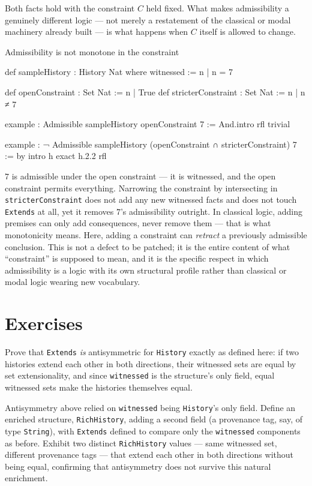 Both facts hold with the constraint $C$ held fixed. What makes
admissibility a genuinely different logic — not merely a restatement
of the classical or modal machinery already built — is what happens
when $C$ itself is allowed to change.

\begin{countermodel}{Admissibility is not monotone in the constraint}
\begin{lean}
def sampleHistory : History Nat where
  witnessed := {n | n = 7}

def openConstraint : Set Nat := {n | True}
def stricterConstraint : Set Nat := {n | n ≠ 7}

example : Admissible sampleHistory openConstraint 7 :=
  And.intro rfl trivial

example :
    ¬ Admissible sampleHistory (openConstraint ∩ stricterConstraint) 7 := by
  intro h
  exact h.2.2 rfl
\end{lean}
$7$ is admissible under the open constraint — it is witnessed, and
the open constraint permits everything. Narrowing the constraint by
intersecting in \texttt{stricterConstraint} does not add any new
witnessed facts and does not touch \texttt{Extends} at all, yet it
removes $7$'s admissibility outright. In classical logic, adding
premises can only add consequences, never remove them — that is
what monotonicity means. Here, adding a constraint can \emph{retract}
a previously admissible conclusion. This is not a defect to be
patched; it is the entire content of what ``constraint'' is supposed
to mean, and it is the specific respect in which admissibility is a
logic with its own structural profile rather than classical or
modal logic wearing new vocabulary.
\end{countermodel}

\section{Exercises}

\begin{exercise}
Prove that \texttt{Extends} \emph{is} antisymmetric for
\texttt{History} exactly as defined here: if two histories extend
each other in both directions, their witnessed sets are equal by
set extensionality, and since \texttt{witnessed} is the structure's
only field, equal witnessed sets make the histories themselves
equal.
\end{exercise}

\begin{exercise}
Antisymmetry above relied on \texttt{witnessed} being
\texttt{History}'s only field. Define an enriched structure,
\texttt{RichHistory}, adding a second field (a provenance tag, say,
of type \texttt{String}), with \texttt{Extends} defined to compare
only the \texttt{witnessed} components as before. Exhibit two
distinct \texttt{RichHistory} values — same witnessed set, different
provenance tags — that extend each other in both directions without
being equal, confirming that antisymmetry does not survive this
natural enrichment.
\end{exercise}
